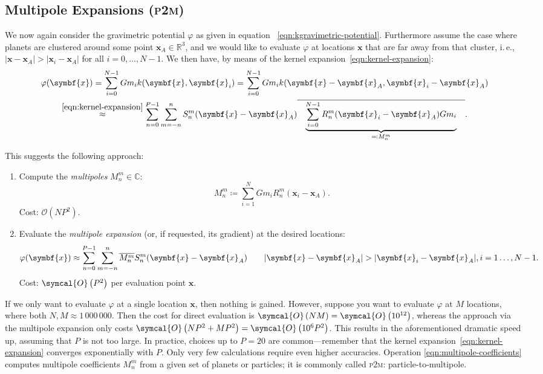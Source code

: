 \documentclass{scrbook}
\newcommand{\PtoM}{\textsc{p2m}}
\newcommand{\reals}{\ensuremath{\mathbb{R}}}
\newcommand{\complex}{\mathbb{C}}
\newcommand{\wholespace}{\ensuremath{\reals^3}}
\newcommand{\vv}[1]{\ensuremath{\symbf{#1}}} %
\newcommand{\bigO}[1]{\ensuremath{\symcal{O}\left({#1}\right)}}
\begin{document}
\subsection{Multipole Expansions (\PtoM)}
We now again consider the gravimetric potential $\varphi$ as given in equation~%
\eqref{eqn:kgravimetric-potential}. Furthermore assume the case where planets
are clustered around some point $\vv{x}_A\in\wholespace$, and we would like to
evaluate $\varphi$ at locations $\vv{x}$ that are far away from that cluster,
i.\,e., $|\vv{x}-\vv{x}_A| > |\vv{x}_i-\vv{x}_A|$ for all $i=0,\dotsc,N-1$. We
then have, by means of the kernel expansion~\eqref{eqn:kernel-expansion}:
\begin{multline}
\varphi(\vv{x})
= \sum_{i=0}^{N-1}Gm_i k(\vv{x},\vv{x}_i)
= \sum_{i=0}^{N-1}Gm_i k(\vv{x}-\vv{x}_A,\vv{x}_i-\vv{x}_A) \\
\stackrel{\eqref{eqn:kernel-expansion}}{\approx}
\sum_{n=0}^{P-1}\sum_{m=-n\vphantom{0}}^n
S_n^m(\vv{x}-\vv{x}_A)
\overline{\quad\underbrace{\sum_{i=0}^{N-1}R_n^m(\vv{x}_i-\vv{x}_A)Gm_i}_%
{\eqqcolon M_n^m}\quad}.
\end{multline}

This suggests the following approach:
\begin{enumerate}
\item Compute the \emph{multipoles} $M_n^m\in\complex$:
\begin{equation}\label{eqn:multipole-coefficients}
M_n^m \coloneqq \sum_{i=1}^N Gm_iR_n^m(\vv{x}_i-\vv{x}_A).
\end{equation}
Cost: $\mathcal{O}(NP^2)$.
\item Evaluate the \emph{multipole expansion} (or, if requested, its gradient)
at the desired locations:
\begin{equation}\label{eqn:multipole-expansion}
\varphi(\vv{x})\approx
\sum_{n=0}^{P-1}\sum_{m=-n\vphantom{0}}^n \overline{M_n^m}S_n^m(\vv{x}-\vv{x}_A)
\qquad
|\vv{x}-\vv{x}_A| > |\vv{x}_i-\vv{x}_A|, i=1\dotsc,N-1.
\end{equation}
Cost: \bigO{P^2} per evaluation point $\vv{x}$.
\end{enumerate}

If we only want to evaluate $\varphi$ at a single location $\vv{x}$, then
nothing is gained. However, suppose you want to evaluate $\varphi$ at
$M$ locations, where both $N,M\approx 1\,000\,000$. Then the cost for direct
evaluation is $\bigO{NM}=\bigO{10^{12}}$, whereas the approach via the
multipole expansion only costs $\bigO{NP^2 + MP^2}=\bigO{10^6P^2}$. This
results in the aforementioned dramatic speed up, assuming that $P$ is not too
large. In practice, choices up to $P=20$ are common---remember that the kernel
expansion~\eqref{eqn:kernel-expansion} converges exponentially with $P$. Only
very few calculations require even higher accuracies. Operation
\eqref{eqn:multipole-coefficients} computes multipole coefficients $M_n^m$ from
a given set of planets or particles; it is commonly called \textsc{p2m}:
particle-to-multipole.
\end{document}
